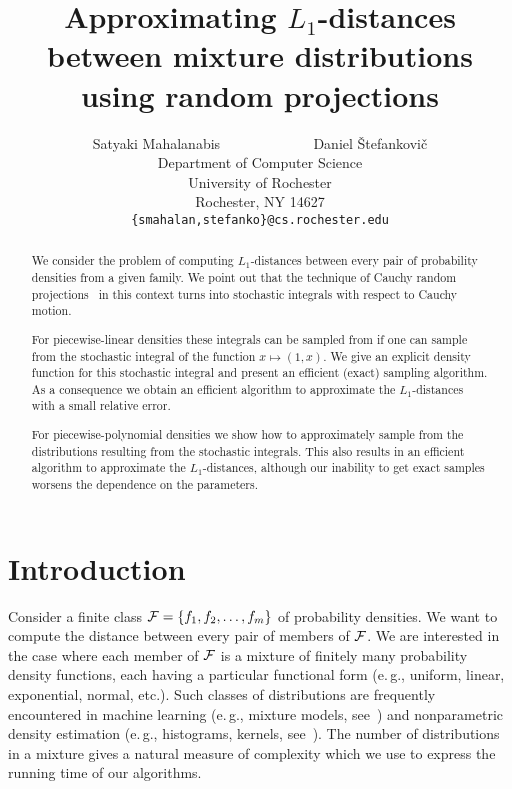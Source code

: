 \documentclass[11pt]{article}
\date{}
\title{Approximating $L_1$-distances between mixture distributions using random projections}
\author{Satyaki Mahalanabis $\quad\quad\quad\quad\quad\quad$ Daniel \v{S}tefankovi\v{c}
\vspace{0.2cm}\\
Department of Computer Science\\ University of Rochester\\ Rochester, NY 14627\\
{\tt \{smahalan,stefanko\}@cs.rochester.edu}}
\begin{document}
\maketitle

\begin{abstract}
We consider the problem of computing $L_1$-distances between every pair of
probability densities from a given family. We point out that the technique
of Cauchy random projections~\cite{I06} in this context turns into stochastic
integrals with respect to Cauchy motion.

For piecewise-linear densities these integrals can be sampled from
if one can sample from the stochastic integral of the function
$x\mapsto (1,x)$. We give an explicit density function for this
stochastic integral and present an efficient (exact) sampling
algorithm. As a consequence we obtain an efficient algorithm to
approximate the $L_1$-distances with a small relative error.

For piecewise-polynomial densities we show how to approximately
sample from the distributions resulting from the stochastic
integrals. This also results in an efficient algorithm to
approximate the $L_1$-distances, although our inability to get
exact samples worsens the dependence on the parameters.
\end{abstract}

\section{Introduction}

Consider a finite class ${\cal F} = \{ f_1, f_2, \ldots, f_m \}$ of probability densities.
We want to compute the distance between every pair of members of ${\cal F}$.
We are interested in the case where each member of ${\cal F}$ is a mixture of finitely
many probability density functions, each having a particular functional form
(e.\,g., uniform, linear, exponential, normal, etc.). Such classes of distributions are frequently
encountered in machine learning (e.\,g., mixture models, see~\cite{Bish06}) and  nonparametric density
estimation (e.\,g., histograms, kernels, see~\cite{DG01}). The number of distributions in a mixture
gives a natural measure of complexity which we use to express the running time of our
algorithms.
\end{document}
